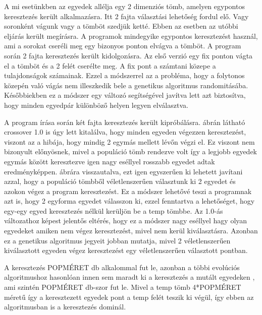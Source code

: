 \documentclass[12ppt,a4paper,oneside]{report}
\begin{document}
            {A mi esetünkben az egyedek allélja egy 2 dimenziós tömb, amelyen egypontos keresztezés került alkalmazásra. Itt 2 fajta választási lehetőség fordul elő. Vagy soronként vágunk vagy a tömböt szedjük ketté. Ebben az esetben az utóbbi eljárás került megírásra. A programok mindegyike egypontos keresztezést használ, ami a sorokat cseréli meg egy bizonyos ponton elvágva a tömböt. A program során 2 fajta keresztezés került kidolgozásra. Az első verzió egy fix ponton vágta el a tömböt és a 2 felét cserélte meg. A fix pont a számtani közepe a tulajdonságok számainak. Ezzel a módszerrel az a probléma, hogy a folytonos közepén való vágás nem illeszkedik bele a genetikus algoritmus randomitásába. Későbbiekben ez a módszer egy változó segítségével javítva lett azt biztosítva, hogy minden egyedpár különböző helyen legyen elválasztva.}
            
            {A program írása során két fajta keresztezés került kipróbálásra.  ábrán látható crossover 1.0 is úgy lett kitalálva, hogy minden egyeden végezzen keresztezést, viszont az a hibája, hogy mindig 2 egymás mellett lévőn végzi el. Ez viszont nem bizonyult előnyösnek, mivel a populáció tömb rendezve volt így a legjobb egyedek egymás között keresztezve igen nagy eséllyel rosszabb egyedet adtak eredményképpen.  ábrára visszautalva, ezt igen egyszerűen ki lehetett javítani azzal, hogy a populáció tömbből véletlenszerűen választunk ki 2 egyedet és azokon végez a program keresztezést. Ez a módszer lehetővé teszi a programnak azt is, hogy 2 egyforma egyedet válasszon ki, ezzel fenntartva a lehetőséget, hogy egy-egy egyed keresztezés nélkül kerüljön be a temp tömbbe. Az 1.0-ás változathoz képest jelentős eltérés, hogy ez a módszer nagy eséllyel hagy olyan egyedeket amiken nem végez keresztezést, mivel nem kerül kiválasztásra. Azonban ez a genetikus algoritmus jegyeit jobban mutatja, mivel 2 véletlenszerűen kiválasztott egyeden végez keresztezést egy véletlenszerűen választott pontban.}
            
            {A keresztezés POPMÉRET db alkalommal fut le, azonban a többi evolúciós algoritmushoz hasonlóan innen sem maradt ki a keresztezés a mutált egyedeken , ami szintén POPMÉRET db-szor fut le. Mivel a temp tömb 4*POPMÉRET méretű így a keresztezett egyedek pont a temp felét teszik ki végül, így ebben az algoritmusban is a keresztezés dominál.}
        
\end{document}
